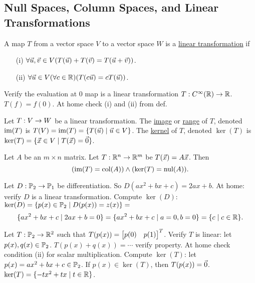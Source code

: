\documentclass[10pt,a4paper]{article}
\begin{document}
\subsection{Null Spaces, Column Spaces, and Linear Transformations}
\begin{definition}
	A map $T$ from a vector space $V$ to a vector space $W$ is a \underline{linear transformation} if 
	\begin{enumerate}
		\item[(i)] $\forall \vec{u},\vec{v}\in V (T(\vec{u})+T(\vec{v}) = T(\vec{u}+ \vec{v}))$.
		\item[(ii)] $\forall \vec{u} \in V (\forall c\in\mathbb{R})(T(c\vec{u}) = cT(\vec{u}))$.
	\end{enumerate}
\end{definition}

\begin{example}
	Verify the evaluation at 0 map is a linear transformation $T:C^\infty(\mathbb{R}) \rightarrow \mathbb{R}$. $T(f) = f(0)$. At home check (i) and (ii) from def.
\end{example}

\begin{definition}
	Let $T:V \rightarrow W$ be a linear transformation. The \underline{image} or \underline{range} of $T$, denoted $\text{im}(T)$ is $T(V) = \text{im}(T) = \{T(\vec{u}) \mid \vec{u}\in V\}$. The \underline{kernel} of $T$, denoted $\ker(T)$ is $\ker(T) = \{\vec{x}\in V \mid T(\vec{x}) = \vec{0} \}$.
\end{definition}

\begin{example}
	Let $A$ be an $m\times n$ matrix. Let $T:\mathbb{R}^n \rightarrow \mathbb{R}^m$ be $T(\vec{x}) = A\vec{x}$. Then $$(\text{im}(T) = \text{col}(A)) \land (\ker(T) = \text{nul}(A)).$$
\end{example}

\begin{example}
	Let $D:\mathbb{P}_2 \rightarrow \mathbb{P}_1$ be differentiation. So $D(ax^2+bx+c) = 2ax+b$. At home: verify $D$ is a linear transformation. Compute $\ker(D)$: $\ker(D) = \{p(x)\in\mathbb{P}_2 \mid D(p(x)) = z(x) \}=$ $$\{ax^2+bx+c \mid 2ax+b = 0 \} = \{ ax^2+bx+c \mid a=0,b=0\} = \{c\mid c\in \mathbb{R}\}.$$
\end{example}

\begin{example}
	Let $T:\mathbb{P}_2 \rightarrow \mathbb{R}^2$ such that $T(p(x)) = \begin{bmatrix}p(0)&p(1)\end{bmatrix}^T$. Verify $T$ is linear: let $p(x),q(x)\in\mathbb{P}_2$. $T(p(x)+q(x)) = \cdots$ verify property. At home check condition (ii) for scalar multiplication. Compute $\ker(T)$: let $p(x) = ax^2 + bx+c\in\mathbb{P}_2$. If $p(x) \in \ker(T)$, then $T(p(x)) = \vec{0}$. $\ker(T) = \{-tx^2 + tx \mid t\in\mathbb{R}\}$.
\end{example}
\end{document}
